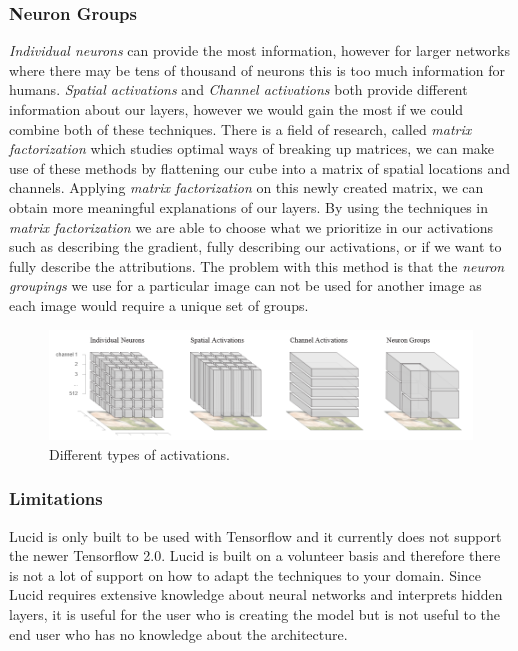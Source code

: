 \subsubsection{Neuron Groups}
\emph{Individual neurons} can provide the most information, however for larger networks where there may be tens of thousand of neurons this is too much information for humans. \emph{Spatial activations} and \emph{Channel activations} both provide different information about our layers, however we would gain the most if we could combine both of these techniques. There is a field of research, called \emph{matrix factorization} which studies optimal ways of breaking up matrices, we can make use of these methods by flattening our cube into a matrix of spatial locations and channels. Applying \emph{matrix factorization} on this newly created matrix, we can obtain more meaningful explanations of our layers.  By using the techniques in \emph{matrix factorization} we are able to choose what we prioritize in our activations such as describing the gradient, fully describing our activations, or if we want to fully describe the attributions. The problem with this method is that the \emph{neuron groupings} we use for a particular image can not be used for another image as each image would require a unique set of groups. 
\begin  {figure}[!htpb]
  \includegraphics[width=\linewidth]{Evaluation_Images/LUCID_maps.png}
  \caption{Different types of activations. \cite{olah2018the}}
  \label{fig:lucid-maps}
\end{figure}




\subsubsection{Limitations}
Lucid is only built to be used with Tensorflow and it currently does not support the newer Tensorflow 2.0. Lucid is built on a volunteer basis and therefore there is not a lot of support on how to adapt the techniques to your domain. Since Lucid requires extensive knowledge about neural networks and interprets hidden layers, it is useful for the user who is creating the model but is not useful to the end user who has no knowledge about the architecture.
